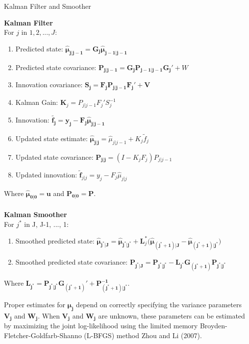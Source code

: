 \documentclass[
]{article}
\begin{document}
\begin{algorithm}
\caption{Kalman Filter and Smoother}\label{alg:kfks}
\textbf{Kalman Filter}\\ 
For $j$ in $1, 2, ..., J$:
\begin{enumerate}
  \item {Predicted state:} $\boldsymbol{\hat \mu_{j|j-1}} = \boldsymbol{G_j} \boldsymbol{\hat \mu_{j-1|j-1}}$
  \item {Predicted state covariance:} $\boldsymbol{P_{j|j-1}} = \boldsymbol{G_jP_{j-1|j-1}G_j'} + W$
  \item {Innovation covariance:} $\boldsymbol{S_j = F_jP_{j|j-1}F_j' + V}$
  \item {Kalman Gain:} $\boldsymbol{K}_j = P_{j|j-1}F_j'S^{-1}_j$
  \item {Innovation:} $\boldsymbol{\tilde{f_j} = y_j - F_j \hat \mu_{j|j-1}}$
  \item {Updated state estimate:} $\boldsymbol{\hat \mu_{j|j}} = \hat \mu_{j|j-1} + K_j \tilde f_j$
  \item {Updated state covariance:} $\boldsymbol{P_{j|j}} = (I- K_jF_j)P_{j|j-1}$
  \item {Updated innovation:} $\boldsymbol{\tilde f}_{j|j} = y_j - F_j \hat \mu_{j|j}$
\end{enumerate}
Where $\boldsymbol{\hat\mu_{0|0}} = \boldsymbol{u}$ and $\boldsymbol{P_{0|0}} = \boldsymbol{P}$.
\\
\\
\textbf{Kalman Smoother} \\ 
For $j^*$ in J, J-1, ..., 1:
\begin{enumerate}
  \item Smoothed predicted state: $\boldsymbol{\hat\mu_{j^*|J}} = \boldsymbol{\hat \mu_{j^*|j^*}} + \boldsymbol{L}_j^* (\boldsymbol{\hat \mu_{(j^*+1)|J}} - \boldsymbol{\hat \mu_{(j^*+1)|j^*})}$
  \item Smoothed predicted state covariance:  $\boldsymbol{P_{j^*|J}} = \boldsymbol{P_{j^*|j^*}} - \boldsymbol{L_{j^*} G_{(j^*+1)} P_{j^*|j^*}}$
\end{enumerate}
Where $\boldsymbol{L_{j^*} = P_{{j^*}|{j^*}} G_{({j^*}+1)}' + P^{-1}_{({j^*}+1)|{j^*}}}$. 
\end{algorithm}

Proper estimates for \(\boldsymbol{\mu_j}\) depend on correctly specifying the variance parameters \(\boldsymbol{V_j}\) and \(\boldsymbol{W_j}\). When \(\boldsymbol{V_j}\) and \(\boldsymbol{W_j}\) are unknown, these parameters can be estimated by maximizing the joint log-likelihood using the limited memory Broyden-Fletcher-Goldfarb-Shanno (L-BFGS) method Zhou and Li (2007).
\end{document}

